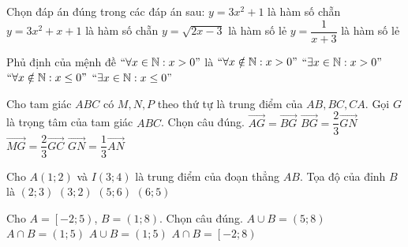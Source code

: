 \begin{ex}%
Chọn đáp án đúng trong các đáp án sau:
	\choice
	{\True $y = 3x^2 + 1$ là hàm số chẵn}
	{$y = 3x^2 + x + 1$ là hàm số chẵn}
	{$y = \sqrt{2x - 3}$ là hàm số lẻ}
	{$y = \dfrac{1}{x + 3}$ là hàm số lẻ}
\end{ex}

\begin{ex}%
Phủ định của mệnh đề $``\forall x \in \mathbb{N} : x > 0"$ là
	\choice
	{$``\forall x \notin \mathbb{N} : x > 0"$}
	{$``\exists x \in \mathbb{N} : x > 0"$}
	{$``\forall x \notin \mathbb{N} : x \leq 0"$}
	{\True $``\exists x \in \mathbb{N} : x \leq 0"$}
\end{ex}

\begin{ex}%
Cho tam giác $ABC$ có $M, N, P$ theo thứ tự là trung điểm của $AB, BC, CA$. Gọi $G$ là trọng tâm của tam giác $ABC$. Chọn câu đúng.
	\choice
	{$\overrightarrow{AG} = \overrightarrow{BG}$}
	{$\overrightarrow{BG} = \dfrac{2}{3} \overrightarrow{GN}$}
	{$\overrightarrow{MG} = \dfrac{2}{3}\overrightarrow{GC}$}
	{\True $\overrightarrow{GN} = \dfrac{1}{3}\overrightarrow{AN}$}
\end{ex}

\begin{ex}%
Cho $A(1; 2)$ và $I(3; 4)$ là trung điểm của đoạn thẳng $AB$. Tọa độ của đỉnh $B$ là
	\choice
	{$(2; 3)$}
	{$(3; 2)$}
	{\True $(5; 6)$}
	{$(6; 5)$}
\end{ex}

\begin{ex}%
Cho $A = \left[ -2; 5\right)$, $B = (1; 8)$. Chọn câu đúng.
	\choice
	{$A \cup B = (5; 8)$}
	{\True $A \cap B = (1; 5)$}
	{$A \cup B = (1; 5)$}
	{$A \cap B = \left[ -2; 8\right)$}
\end{ex}

